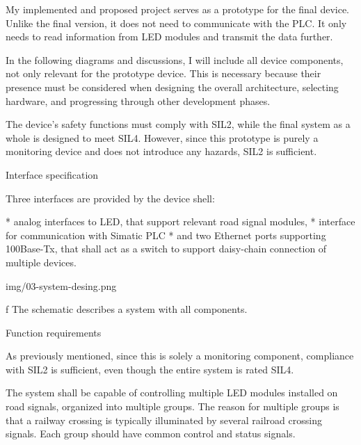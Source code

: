 My implemented and proposed project serves as a prototype for the final device. Unlike the final version, it does not need to communicate with the PLC. It only needs to read information from LED modules and transmit the data further.  

In the following diagrams and discussions, I will include all device components, not only relevant for the prototype device. This is necessary because their presence must be considered when designing the overall architecture, selecting hardware, and progressing through other development phases.

The device's safety functions must comply with SIL2, while the final system as a whole is designed to meet SIL4. However, since this prototype is purely a monitoring device and does not introduce any hazards, SIL2 is sufficient.

\secc Interface specification

Three interfaces are provided by the device shell:

\begitems
* {\sbf analog interfaces} to LED, that support relevant road signal modules,
* interface for {\sbf communication with Simatic PLC}
* and {\sbf two Ethernet ports} supporting 100Base-Tx, that shall act as a switch to support daisy-chain connection of multiple devices.
\enditems

\medskip
{}
\picw=12cm \cinspic img/03-system-desing.png
\caption/f The schematic describes a system with all components.
\medskip

\secc Function requirements

As previously mentioned, since this is solely a monitoring component, compliance with SIL2 is sufficient, even though the entire system is rated SIL4. 

The system shall be capable of controlling multiple LED modules installed on road signals, organized into multiple groups. The reason for multiple groups is that a railway crossing is typically illuminated by several railroad crossing signals. Each group should have common control and status signals.

